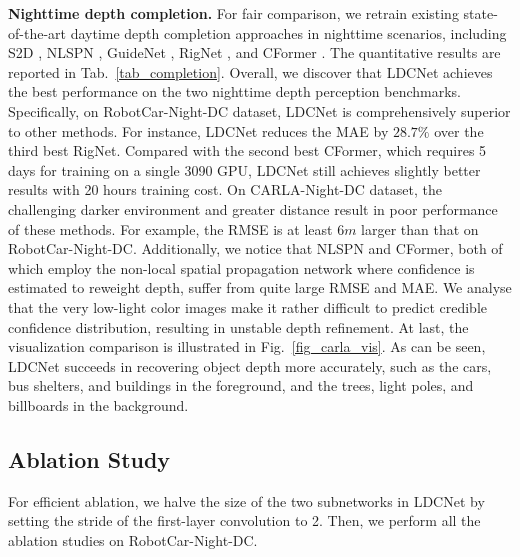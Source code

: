 \documentclass{article}
\begin{document}
\textbf{Nighttime depth completion.} For fair comparison, we retrain existing state-of-the-art daytime depth completion approaches in nighttime scenarios, including S2D \cite{ma2018self}, NLSPN \cite{park2020nonlocal}, GuideNet \cite{tang2020learning}, RigNet \cite{yan2022rignet}, and CFormer \cite{Zhang2023CompletionFormer}. The quantitative results are reported in Tab.~\ref{tab_completion}. Overall, we discover that LDCNet achieves the best performance on the two nighttime depth perception benchmarks. Specifically, on RobotCar-Night-DC dataset, LDCNet is comprehensively superior to other methods. For instance, LDCNet reduces the MAE by $28.7\%$ over the third best RigNet. Compared with the second best CFormer, which requires 5 days for training on a single 3090 GPU, LDCNet still achieves slightly better results with 20 hours training cost. On CARLA-Night-DC dataset, the challenging darker environment and greater distance result in poor performance of these methods. For example, the RMSE is at least $6m$ larger than that on RobotCar-Night-DC. Additionally, we notice that NLSPN and CFormer, both of which employ the non-local spatial propagation network \cite{park2020nonlocal} where confidence is estimated to reweight depth, suffer from quite large RMSE and MAE. We analyse that the very low-light color images make it rather difficult to predict credible confidence distribution, resulting in unstable depth refinement. At last, the visualization comparison is illustrated in Fig.~\ref{fig_carla_vis}. As can be seen, LDCNet succeeds in recovering object depth more accurately, such as the cars, bus shelters, and buildings in the foreground, and the trees, light poles, and billboards in the background. 


\subsection{Ablation Study}
For efficient ablation, we halve the size of the two subnetworks in LDCNet by setting the stride of the first-layer convolution to 2. Then, we perform all the ablation studies on RobotCar-Night-DC.


\begin{table}
\vspace{-18pt}
\centering
\caption{Ablation on components of LDCNet.}
\vspace{4pt}
\label{tab_ab_ldcnet}
\vspace{-8pt}
\end{table}
\end{document}
